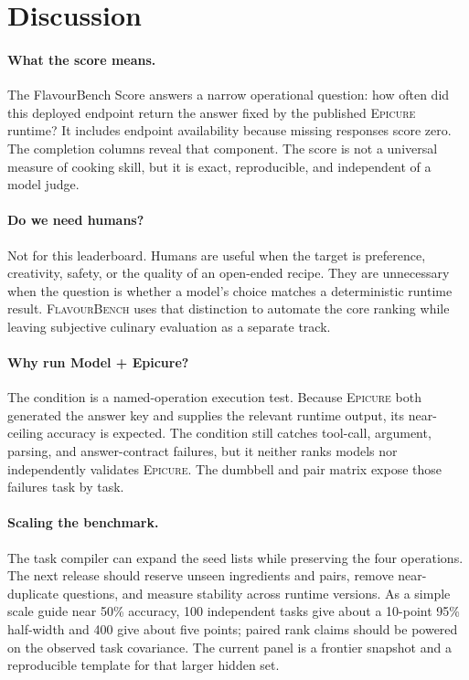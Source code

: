 \documentclass[10pt,twocolumn]{article}
\newcommand{\system}{\textsc{FlavourBench}}
\newcommand{\epicure}{\textsc{Epicure}}
\begin{document}
\section{Discussion}
\label{sec:discussion}

\paragraph{What the score means.}
The FlavourBench Score answers a narrow operational question: how often did this deployed endpoint
return the answer fixed by the published \epicure{} runtime? It includes endpoint availability
because missing responses score zero. The completion columns reveal that component. The score is
not a universal measure of cooking skill, but it is exact, reproducible, and independent of a
model judge.

\paragraph{Do we need humans?}
Not for this leaderboard. Humans are useful when the target is preference, creativity, safety, or
the quality of an open-ended recipe. They are unnecessary when the question is whether a model's
choice matches a deterministic runtime result. \system{} uses that distinction to automate the
core ranking while leaving subjective culinary evaluation as a separate track.

\paragraph{Why run Model + Epicure?}
The condition is a named-operation execution test. Because \epicure{} both generated the answer
key and supplies the relevant runtime output, its near-ceiling accuracy is expected. The condition
still catches tool-call, argument, parsing, and answer-contract failures, but it neither ranks
models nor independently validates \epicure{}. The dumbbell and pair matrix expose those failures
task by task.

\paragraph{Scaling the benchmark.}
The task compiler can expand the seed lists while preserving the four operations. The next release
should reserve unseen ingredients and pairs, remove near-duplicate questions, and measure stability
across runtime versions. As a simple scale guide near 50\% accuracy, 100 independent tasks give
about a 10-point 95\% half-width and 400 give about five points; paired rank claims should be powered
on the observed task covariance. The current panel is a frontier snapshot and a reproducible
template for that larger hidden set.
\end{document}

